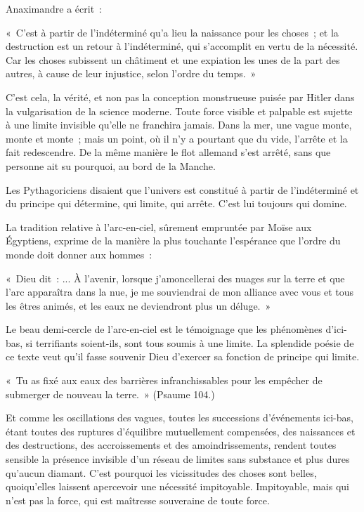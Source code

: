 \documentclass[french,twoside]{book} %
\begin{document}
\noindent Anaximandre a écrit :\par
« C'est à partir de l'indéterminé qu'a lieu la naissance pour les choses ; et la destruction est un retour à l'indéterminé, qui s'accomplit en vertu de la nécessité. Car les choses subissent un châtiment et une expiation les unes de la part des autres, à cause de leur injustice, selon l'ordre du temps. »\par
C'est cela, la vérité, et non pas la conception monstrueuse puisée par Hitler dans la vulgarisation de la science moderne. Toute force visible et palpable est sujette à une limite invisible qu'elle ne franchira jamais. Dans la mer, une vague monte, monte et monte ; mais un point, où il n'y a pourtant que du vide, l'arrête et la fait redescendre. De la même manière le flot allemand s'est arrêté, sans que personne ait su pourquoi, au bord de la Manche.\par
Les Pythagoriciens disaient que l'univers est constitué à partir de l'indéterminé et du principe qui détermine, qui limite, qui arrête. C'est lui toujours qui domine.\par
\par
La tradition relative à l'arc-en-ciel, sûrement empruntée par Moïse aux Égyptiens, exprime de la manière la plus touchante l'espérance que l'ordre du monde doit donner aux hommes :\par
« Dieu dit : ... À l'avenir, lorsque j'amoncellerai des nuages sur la terre et que l'arc apparaîtra dans la nue, je me souviendrai de mon alliance avec vous et tous les êtres animés, et les eaux ne deviendront plus un déluge. »\par
Le beau demi-cercle de l'arc-en-ciel est le témoignage que les phénomènes d’ici-bas, si terrifiants soient-ils, sont tous soumis à une limite. La splendide poésie de ce texte veut qu'il fasse souvenir Dieu d'exercer sa fonction de principe qui limite.\par
« Tu as fixé aux eaux des barrières infranchissables pour les empêcher de submerger de nouveau la terre. » (Psaume 104.)\par
Et comme les oscillations des vagues, toutes les successions d'événements ici-bas, étant toutes des ruptures d'équilibre mutuellement compensées, des naissances et des destructions, des accroissements et des amoindrissements, rendent toutes sensible la présence invisible d'un réseau de limites sans substance et plus dures qu'aucun diamant. C'est pourquoi les vicissitudes des choses sont belles, quoiqu'elles laissent apercevoir une nécessité impitoyable. Impitoyable, mais qui n'est pas la force, qui est maîtresse souveraine de toute force.\par
\end{document}
